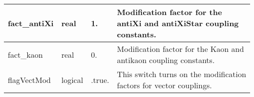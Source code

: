 \documentclass{article}
\begin{document}
\begin{longtable}{llll}
\midrule
fact\_antiXi & \begin{minipage}[t]{2cm}real\end{minipage} & \begin{minipage}[t]{2cm}1.\end{minipage} & \begin{minipage}[t]{12cm}Modification factor for the antiXi and antiXiStar coupling constants.\end{minipage}\\*
\midrule
fact\_kaon & \begin{minipage}[t]{2cm}real\end{minipage} & \begin{minipage}[t]{2cm}0.\end{minipage} & \begin{minipage}[t]{12cm}Modification factor for the Kaon and antikaon coupling constants.\end{minipage}\\*
\midrule
flagVectMod & \begin{minipage}[t]{2cm}logical\end{minipage} & \begin{minipage}[t]{2cm}.true.\end{minipage} & \begin{minipage}[t]{12cm}This switch turns on the modification factors for vector couplings.\end{minipage}\\*
\bottomrule
\end{longtable}
{ }



\end{document}
